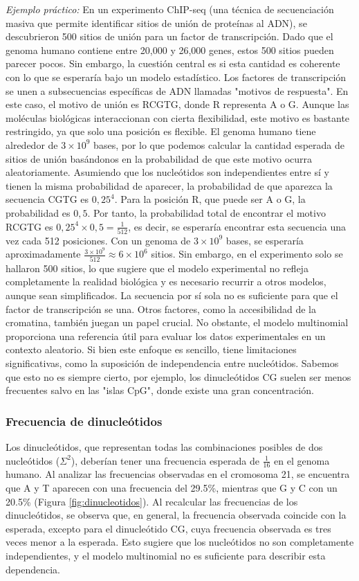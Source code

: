 \textit{Ejemplo práctico:}
En un experimento ChIP-seq (una técnica de secuenciación masiva que permite identificar sitios de unión de proteínas al ADN), se descubrieron 500 sitios de unión para un factor de transcripción. Dado que el genoma humano contiene entre 20,000 y 26,000 genes, estos 500 sitios pueden parecer pocos. Sin embargo, la cuestión central es si esta cantidad es coherente con lo que se esperaría bajo un modelo estadístico.
Los factores de transcripción se unen a subsecuencias específicas de ADN llamadas "motivos de respuesta". En este caso, el motivo de unión es RCGTG, donde R representa A o G. Aunque las moléculas biológicas interaccionan con cierta flexibilidad, este motivo es bastante restringido, ya que solo una posición es flexible. El genoma humano tiene alrededor de $3 \times 10^9$ bases, por lo que podemos calcular la cantidad esperada de sitios de unión basándonos en la probabilidad de que este motivo ocurra aleatoriamente.
Asumiendo que los nucleótidos son independientes entre sí y tienen la misma probabilidad de aparecer, la probabilidad de que aparezca la secuencia CGTG es $0,25^4$. Para la posición R, que puede ser A o G, la probabilidad es $0,5$. Por tanto, la probabilidad total de encontrar el motivo RCGTG es $0,25^4 \times 0,5 = \frac{1}{512}$, es decir, se esperaría encontrar esta secuencia una vez cada 512 posiciones. Con un genoma de $3 \times 10^9$ bases, se esperaría aproximadamente $\frac{3 \times 10^9}{512} \approx 6 \times 10^6$ sitios. Sin embargo, en el experimento solo se hallaron 500 sitios, lo que sugiere que el modelo experimental no refleja completamente la realidad biológica y es necesario recurrir a otros modelos, aunque sean simplificados.
La secuencia por sí sola no es suficiente para que el factor de transcripción se una. Otros factores, como la accesibilidad de la cromatina, también juegan un papel crucial. No obstante, el modelo multinomial proporciona una referencia útil para evaluar los datos experimentales en un contexto aleatorio.
Si bien este enfoque es sencillo, tiene limitaciones significativas, como la suposición de independencia entre nucleótidos. Sabemos que esto no es siempre cierto, por ejemplo, los dinucleótidos CG suelen ser menos frecuentes salvo en las "islas CpG", donde existe una gran concentración.

\subsubsection{Frecuencia de dinucleótidos}
Los dinucleótidos, que representan todas las combinaciones posibles de dos nucleótidos ($\Sigma^2$), deberían tener una frecuencia esperada de $\frac{1}{16}$ en el genoma humano. Al analizar las frecuencias observadas en el cromosoma 21, se encuentra que A y T aparecen con una frecuencia del 29.5\%, mientras que G y C con un 20.5\% (Figura \ref{fig:dinucleotidos}). Al recalcular las frecuencias de los dinucleótidos, se observa que, en general, la frecuencia observada coincide con la esperada, excepto para el dinucleótido CG, cuya frecuencia observada es tres veces menor a la esperada. Esto sugiere que los nucleótidos no son completamente independientes, y el modelo multinomial no es suficiente para describir esta dependencia.


